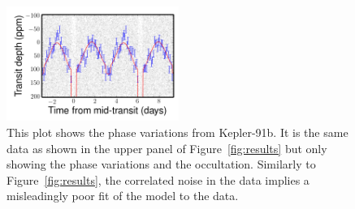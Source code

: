 \documentclass[apjl]{emulateapj}
\begin{document}
\begin{figure}
\includegraphics[width=0.50\textwidth]{koi2133_zoom.png}
\caption{This plot shows the phase variations from Kepler-91b. It is the same data as shown in the upper panel of Figure~\ref{fig:results} but only showing the phase variations and the occultation. Similarly to Figure~\ref{fig:results}, the correlated noise in the data implies a misleadingly poor fit of the model to the data.}
\label{fig:results_zoom}
\end{figure}
\end{document}
